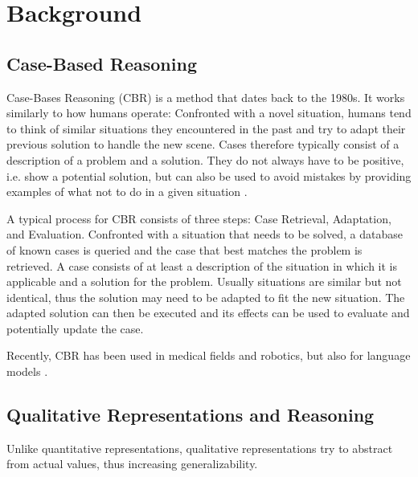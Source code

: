 \section{Background}\label{sec:background}

\subsection{Case-Based Reasoning}
Case-Bases Reasoning (CBR) is a method that dates back to the 1980s. It works similarly to how humans operate: Confronted with a novel situation, humans tend to think of similar situations they encountered in the past and try to adapt their previous solution to handle the new scene. Cases therefore typically consist of a description of a problem and a solution. They do not always have to be positive, i.e. show a potential solution, but can also be used to avoid mistakes by providing examples of what not to do in a given situation \cite{Kolodner1992}.

A typical process for \ac{CBR} consists of three steps: Case Retrieval, Adaptation, and Evaluation.\cite{Kolodner1992}
Confronted with a situation that needs to be solved, a database of known cases is queried and the case that best matches the problem is retrieved. A case consists of at least a description of the situation in which it is applicable and a solution for the problem. Usually situations are similar but not identical, thus the solution may need to be adapted to fit the new situation. The adapted solution can then be executed and its effects can be used to evaluate and potentially update the case.


Recently, CBR has been used in medical fields\cite{medical1, medical2} and robotics\cite{QCBR}, but also for language models \cite{text, text2}. %

\subsection{Qualitative Representations and Reasoning}
Unlike quantitative representations, qualitative representations try to abstract from actual values, thus increasing generalizability.



